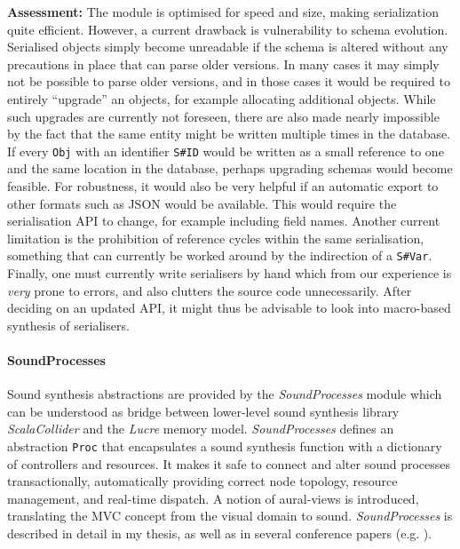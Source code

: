 \documentclass[11pt,a4paper]{article}
\newcommand{\software}[1]{\textit{#1}}
\begin{document}
\textbf{Assessment:} The module is optimised for speed and size, making serialization quite efficient. However, a current drawback is vulnerability to schema evolution. Serialised objects simply become unreadable if the schema is altered without any precautions in place that can parse older versions. In many cases it may simply not be possible to parse older versions, and in those cases it would be required to entirely ``upgrade'' an objects, for example allocating additional objects. While such upgrades are currently not foreseen, there are also made nearly impossible by the fact that the same entity might be written multiple times in the database. If every \verb!Obj! with an identifier \verb!S#ID! would be written as a small reference to one and the same location in the database, perhaps upgrading schemas would become feasible. For robustness, it would also be very helpful if an automatic export to other formats such as JSON would be available. This would require the serialisation API to change, for example including field names. Another current limitation is the prohibition of reference cycles within the same serialisation, something that can currently be worked around by the indirection of a \verb!S#Var!. Finally, one must currently write serialisers by hand which from our experience is \emph{very} prone to errors, and also clutters the source code unnecessarily. After deciding on an updated API, it might thus be advisable to look into macro-based synthesis of serialisers.

\paragraph{SoundProcesses}

Sound synthesis abstractions are provided by the \software{SoundProcesses} module which can be understood as bridge between lower-level sound synthesis library \software{ScalaCollider} and the \software{Lucre} memory model. \software{SoundProcesses} defines an abstraction \verb!Proc! that encapsulates a sound synthesis function with a dictionary of controllers and resources. It makes it safe to connect and alter sound processes transactionally, automatically providing correct node topology, resource management, and real-time dispatch. A notion of aural-views is introduced, translating the MVC concept from the visual domain to sound. \software{SoundProcesses} is described in detail in my thesis, as well as in several conference papers (e.g. \cite{rutz2014sound}).
\end{document}

